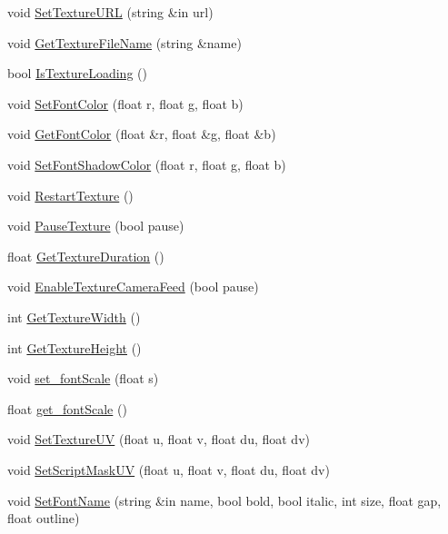 \begin{DoxyCompactItemize}
\item 
void \hyperlink{class_n_g_u_i_label_a8770fa21322b39e537b1c74260dad4a7}{Set\+Texture\+U\+RL} (string \&in url)
\item 
void \hyperlink{class_n_g_u_i_label_a25e41385e7ce214dca5c77dae15cf1d3}{Get\+Texture\+File\+Name} (string \&name)
\item 
bool \hyperlink{class_n_g_u_i_label_ad2326d5fdd87a36c550b4a56179ddc06}{Is\+Texture\+Loading} ()
\item 
void \hyperlink{class_n_g_u_i_label_a593f0ded110c86cc51f8c55604d35f8c}{Set\+Font\+Color} (float r, float g, float b)
\item 
void \hyperlink{class_n_g_u_i_label_a1357fd4ef0e42a446c8250da7845df35}{Get\+Font\+Color} (float \&r, float \&g, float \&b)
\item 
void \hyperlink{class_n_g_u_i_label_a3045e4014941e347bd6a15d7a9c588df}{Set\+Font\+Shadow\+Color} (float r, float g, float b)
\item 
void \hyperlink{class_n_g_u_i_label_a4b2ffa731f4162c7f03cf3281791e841}{Restart\+Texture} ()
\item 
void \hyperlink{class_n_g_u_i_label_a14745d93fbea4ec1f73b2f1e67588773}{Pause\+Texture} (bool pause)
\item 
float \hyperlink{class_n_g_u_i_label_af07793e84af671fa19e5826063984101}{Get\+Texture\+Duration} ()
\item 
void \hyperlink{class_n_g_u_i_label_a08df077b787d4a94b326ddb636edaa59}{Enable\+Texture\+Camera\+Feed} (bool pause)
\item 
int \hyperlink{class_n_g_u_i_label_ad529bb484c268754db147a9fe84d770d}{Get\+Texture\+Width} ()
\item 
int \hyperlink{class_n_g_u_i_label_a84326eae610ef738dccf3a007c980056}{Get\+Texture\+Height} ()
\item 
void \hyperlink{class_n_g_u_i_label_a17c4432c9809115eba55a6e7584493e9}{set\+\_\+font\+Scale} (float s)
\item 
float \hyperlink{class_n_g_u_i_label_aca880b9732537f6298a86610e061046c}{get\+\_\+font\+Scale} ()
\item 
void \hyperlink{class_n_g_u_i_label_ae1502b807847f48cc700069c76903112}{Set\+Texture\+UV} (float u, float v, float du, float dv)
\item 
void \hyperlink{class_n_g_u_i_label_aa8b85395729579ab86aa6206b7247d1f}{Set\+Script\+Mask\+UV} (float u, float v, float du, float dv)
\item 
void \hyperlink{class_n_g_u_i_label_a738e844e6eee5822ab52d13cd3c74c69}{Set\+Font\+Name} (string \&in name, bool bold, bool italic, int size, float gap, float outline)

\end{DoxyCompactItemize}
